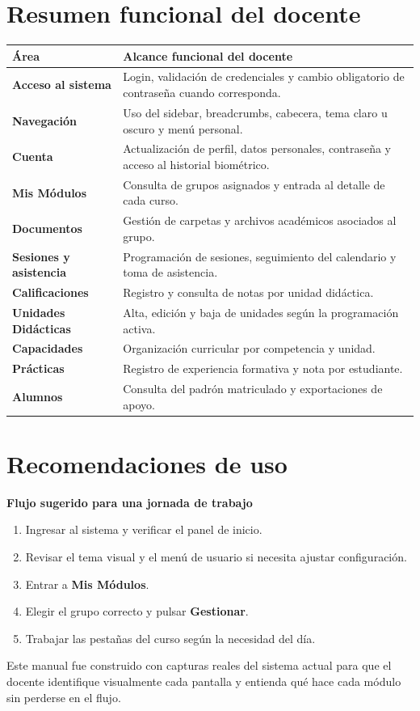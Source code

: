 \documentclass[11pt,a4paper]{article}
\begin{document}
\section{Resumen funcional del docente}

\begin{manualbox}[colback=cetprolight,colframe=cetprodark,boxrule=0.85pt]
\small
\begin{tabularx}{\textwidth}{|>{\raggedright\arraybackslash\bfseries\sffamily}p{}|>{\raggedright\arraybackslash}X|}
\hline
\textcolor{cetprodark}{\'Area} & \textcolor{cetprodark}{Alcance funcional del docente} \\
\hline
Acceso al sistema & Login, validaci\'on de credenciales y cambio obligatorio de contrase\~na cuando corresponda. \\
\hline
Navegaci\'on & Uso del sidebar, breadcrumbs, cabecera, tema claro u oscuro y men\'u personal. \\
\hline
Cuenta & Actualizaci\'on de perfil, datos personales, contrase\~na y acceso al historial biom\'etrico. \\
\hline
Mis M\'odulos & Consulta de grupos asignados y entrada al detalle de cada curso. \\
\hline
Documentos & Gesti\'on de carpetas y archivos acad\'emicos asociados al grupo. \\
\hline
Sesiones y asistencia & Programaci\'on de sesiones, seguimiento del calendario y toma de asistencia. \\
\hline
Calificaciones & Registro y consulta de notas por unidad did\'actica. \\
\hline
Unidades Did\'acticas & Alta, edici\'on y baja de unidades seg\'un la programaci\'on activa. \\
\hline
Capacidades & Organizaci\'on curricular por competencia y unidad. \\
\hline
Pr\'acticas & Registro de experiencia formativa y nota por estudiante. \\
\hline
Alumnos & Consulta del padr\'on matriculado y exportaciones de apoyo. \\
\hline
\end{tabularx}
\end{manualbox}

\section{Recomendaciones de uso}

\begin{stepbox}
\textbf{Flujo sugerido para una jornada de trabajo}
\begin{enumerate}
  \item Ingresar al sistema y verificar el panel de inicio.
  \item Revisar el tema visual y el men\'u de usuario si necesita ajustar configuraci\'on.
  \item Entrar a \textbf{Mis M\'odulos}.
  \item Elegir el grupo correcto y pulsar \textbf{Gestionar}.
  \item Trabajar las pesta\~nas del curso seg\'un la necesidad del d\'ia.
\end{enumerate}
\end{stepbox}

\begin{manualbox}
Este manual fue construido con capturas reales del sistema actual para que el docente identifique visualmente
cada pantalla y entienda qu\'e hace cada m\'odulo sin perderse en el flujo.
\end{manualbox}
\end{document}
